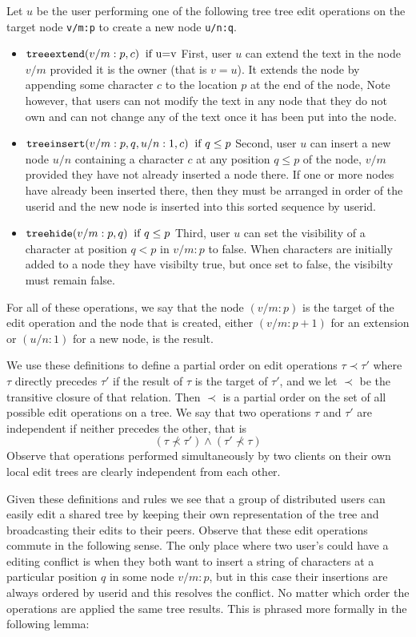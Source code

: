 \documentclass{amsart}
\begin{document}
Let $u$ be the user performing one of the following tree tree edit operations
on the target node {\tt v/m:p} to create a new node {\tt u/n:q}.
\begin{itemize}
\item ${\tt treeextend}(v/m:p,c)\;\;\text{if u=v}$ \newline
First, user $u$ can extend the text in the node $v/m$
provided it is the owner (that is $v=u$). It extends the node by appending
some character $c$ to the location $p$ at the end of the node,
Note however, that users can not modify
the text in any node that they do not own and can not change any of the text
once it has been put into the node.
\item ${\tt treeinsert}(v/m:p,q,u/n:1,c) \;\; \text{if $q\le p$}$
\newline
Second, user $u$ can insert a new node $u/n$ containing a character $c$
at any position $q\le p$ of the node, 
$v/m$ provided
they have not already inserted a node there. If one or more nodes have already been inserted there, then they must be arranged in order of the userid and the new node is inserted into this sorted sequence by userid.
\item ${\tt treehide}(v/m:p,q)  \;\; \text{if $q\le p$}$\newline
Third, user $u$ can set the visibility of a character at position $q < p$
in  $v/m:p$ to false.
When characters are initially added to a node they have visibilty true, but once
set to false, the visibilty must remain false. 
\end{itemize}
For all of these operations, we say that the node $(v/m:p)$ is the target of the edit operation and the node that is created, either $(v/m:p+1)$ for an extension or $(u/n:1)$ for a new node, is the result.  

We use these definitions to define a partial order on edit operations $\tau\prec\tau'$ where $\tau$ directly precedes $\tau'$ if the result of $\tau$ is the target of $\tau'$, and we let $\prec$ be the transitive closure of that relation.  Then $\prec$ is a partial order on the set of all possible edit operations on a tree. We say that two operations $\tau$ and $\tau'$ are independent if neither precedes the other, that is 
\[
\left (\tau\not\prec\tau'\right ) \wedge  \left ( \tau'\not\prec\tau \right )
\]
Observe that operations performed simultaneously by two clients on their own local edit trees are clearly independent from each other.

Given these definitions and rules we see that a group of distributed users can easily edit a 
shared tree by keeping their own representation of the tree and broadcasting
their edits to their peers. Observe that these edit operations commute in
the following sense. The only place where two user's could have a editing
conflict is when they both want to insert a string of characters at a particular
position $q$ in some node $v/m:p$, but in this case their insertions are always
ordered by userid and this resolves the conflict. No matter which order the
operations are applied the same tree results. This is phrased more formally
in the following lemma:
\end{document}
